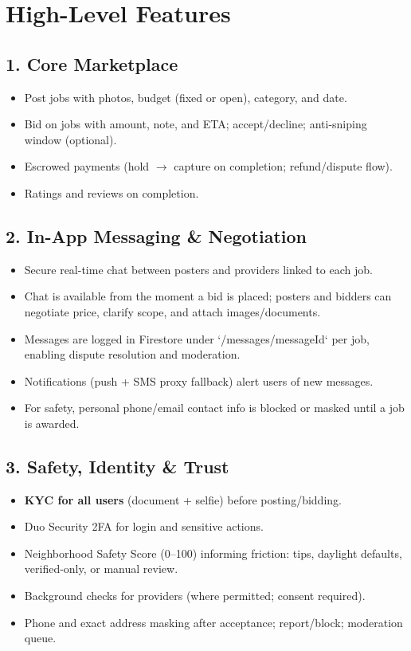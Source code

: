 \documentclass[11pt]{article}
\begin{document}
\newpage

\section{High-Level Features}
\subsection*{1. Core Marketplace}
\begin{itemize}[leftmargin=1.4em]
  \item Post jobs with photos, budget (fixed or open), category, and date.
  \item Bid on jobs with amount, note, and ETA; accept/decline; anti-sniping window (optional).
  \item Escrowed payments (hold $\rightarrow$ capture on completion; refund/dispute flow).
  \item Ratings and reviews on completion.
\end{itemize}

\subsection*{2. In-App Messaging \& Negotiation}
\begin{itemize}[leftmargin=1.4em]
  \item Secure real-time chat between posters and providers linked to each job.
  \item Chat is available from the moment a bid is placed; posters and bidders can negotiate price, clarify scope, and attach images/documents.
  \item Messages are logged in Firestore under `/messages/{messageId}` per job, enabling dispute resolution and moderation.
  \item Notifications (push + SMS proxy fallback) alert users of new messages.
  \item For safety, personal phone/email contact info is blocked or masked until a job is awarded.
\end{itemize}

\subsection*{3. Safety, Identity \& Trust}
\begin{itemize}[leftmargin=1.4em]
  \item \textbf{KYC for all users} (document + selfie) before posting/bidding.
  \item Duo Security 2FA for login and sensitive actions.
  \item Neighborhood Safety Score (0--100) informing friction: tips, daylight defaults, verified-only, or manual review.
  \item Background checks for providers (where permitted; consent required).
  \item Phone and exact address masking after acceptance; report/block; moderation queue.
\end{itemize}
\end{document}
